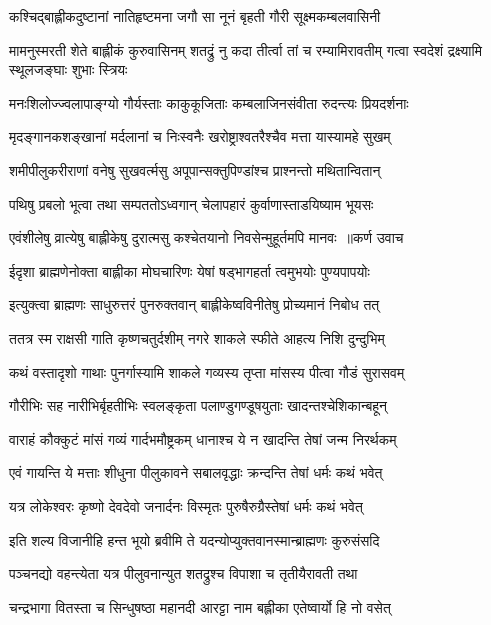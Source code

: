 \twolineshloka
{कश्चिद्बाह्लीकदुष्टानां नातिहृष्टमना जगौ}
{सा नूनं बृहती गौरी सूक्ष्मकम्बलवासिनी}


\threelineshloka
{मामनुस्मरती शेते बाह्लीकं कुरुवासिनम्}
{शतद्रुं नु कदा तीर्त्वा तां च रम्यामिरावतीम्}
{गत्वा स्वदेशं द्रक्ष्यामि स्थूलजङ्घाः शुभाः स्त्रियः}


\twolineshloka
{मनःशिलोज्ज्वलापाङ्ग्यो गौर्यस्ताः काकुकूजिताः}
{कम्बलाजिनसंवीता रुदन्त्यः प्रियदर्शनाः}


\twolineshloka
{मृदङ्गानकशङ्खानां मर्दलानां च निःस्वनैः}
{खरोष्ट्राश्वतरैश्चैव मत्ता यास्यामहे सुखम्}


\twolineshloka
{शमीपीलुकरीराणां वनेषु सुखवर्त्मसु}
{अपूपान्सक्तुपिण्डांश्च प्राश्नन्तो मथितान्वितान्}


\twolineshloka
{पथिषु प्रबलो भूत्वा तथा सम्पततोऽध्वगान्}
{चेलापहारं कुर्वाणास्ताडयिष्याम भूयसः}


\threelineshloka
{एवंशीलेषु व्रात्येषु बाह्लीकेषु दुरात्मसु}
{कश्चेतयानो निवसेन्मुहूर्तमपि मानवः ॥कर्ण उवाच}
{}


\twolineshloka
{ईदृशा ब्राह्मणेनोक्ता बाह्लीका मोघचारिणः}
{येषां षड्भागहर्ता त्वमुभयोः पुण्यपापयोः}


\twolineshloka
{इत्युक्त्वा ब्राह्मणः साधुरुत्तरं पुनरुक्तवान्}
{बाह्लीकेष्वविनीतेषु प्रोच्यमानं निबोध तत्}


\twolineshloka
{ततत्र स्म राक्षसी गाति कृष्णचतुर्दशीम्}
{नगरे शाकले स्फीते आहत्य निशि दुन्दुभिम्}


\twolineshloka
{कथं वस्तादृशो गाथाः पुनर्गास्यामि शाकले}
{गव्यस्य तृप्ता मांसस्य पीत्वा गौडं सुरासवम्}


\twolineshloka
{गौरीभिः सह नारीभिर्बृहतीभिः स्वलङ्कृता}
{पलाण्डुगण्डूषयुताः खादन्तश्चेशिकान्बहून्}


\twolineshloka
{वाराहं कौक्कुटं मांसं गव्यं गार्दभमौष्ट्रकम्}
{धानाश्च ये न खादन्ति तेषां जन्म निरर्थकम्}


\twolineshloka
{एवं गायन्ति ये मत्ताः शीधुना पीलुकावने}
{सबालवृद्धाः क्रन्दन्ति तेषां धर्मः कथं भवेत्}


\twolineshloka
{यत्र लोकेश्वरः कृष्णो देवदेवो जनार्दनः}
{विस्मृतः पुरुषैरुग्रैस्तेषां धर्मः कथं भवेत्}


\twolineshloka
{इति शल्य विजानीहि हन्त भूयो ब्रवीमि ते}
{यदन्योप्युक्तवानस्मान्ब्राह्मणः कुरुसंसदि}


\twolineshloka
{पञ्चनद्यो वहन्त्येता यत्र पीलुवनान्युत}
{शतद्रुश्च विपाशा च तृतीयैरावती तथा}


\twolineshloka
{चन्द्रभागा वितस्ता च सिन्धुषष्ठा महानदी}
{आरट्टा नाम बह्लीका एतेष्वार्यो हि नो वसेत्}


